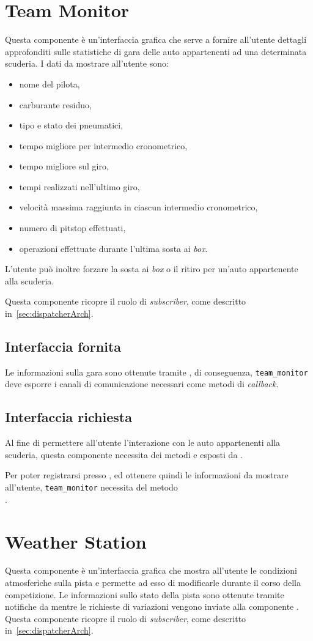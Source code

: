 \section{Team Monitor}
Questa componente è un'interfaccia grafica che serve a fornire all'utente dettagli approfonditi sulle statistiche di gara delle auto appartenenti ad una determinata scuderia.
I dati da mostrare all'utente sono:
\begin{itemize}
\item nome del pilota,
\item carburante residuo,
\item tipo e stato dei pneumatici,
\item tempo migliore per intermedio cronometrico,
\item tempo migliore sul giro,
\item tempi realizzati nell'ultimo giro,
\item velocità massima raggiunta in ciascun intermedio cronometrico,
\item numero di pitstop effettuati,
\item operazioni effettuate durante l'ultima sosta ai \textit{box}.
\end{itemize}
L'utente può inoltre forzare la sosta ai \textit{box} o il ritiro per un'auto appartenente alla scuderia.

Questa componente ricopre il ruolo di \textit{subscriber}, come descritto in~\ref{sec:dispatcherArch}.

\subsection*{Interfaccia fornita}
Le informazioni sulla gara sono ottenute tramite \evdisp{}, di conseguenza, \texttt{team\_monitor} deve esporre i canali di comunicazione necessari come metodi di \textit{callback}.
\subsection*{Interfaccia richiesta}
Al fine di permettere all'utente l'interazione con le auto appartenenti alla scuderia, questa componente necessita dei metodi  e  esposti da \car{}.

Per poter registrarsi presso \evdisp{}, ed ottenere quindi le informazioni da mostrare all'utente, \texttt{team\_monitor} necessita del metodo \\.

\section{Weather Station}
Questa componente è un'interfaccia grafica che mostra all'utente le condizioni atmosferiche sulla pista e permette ad esso di modificarle durante il corso della competizione. Le informazioni sullo stato della pista sono ottenute tramite notifiche da \evdisp{} mentre le richieste di variazioni vengono inviate alla componente \weather{}.
Questa componente ricopre il ruolo di \textit{subscriber}, come descritto in~\ref{sec:dispatcherArch}.

